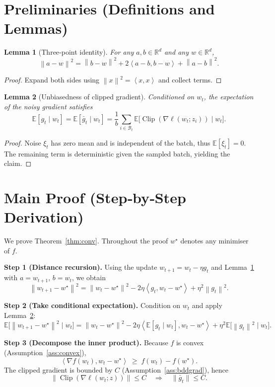 \documentclass{article}
\newtheorem{lemma}{Lemma}
\newcommand{\E}{\mathbb{E}}
\newcommand{\R}{\mathbb{R}}
\newcommand{\norm}[1]{\left\|#1\right\|}
\newcommand{\ip}[2]{\left\langle #1,#2\right\rangle}
\newcommand{\grad}{\nabla}
\newcommand{\clip}[1]{\operatorname{Clip}\!\left(#1\right)}
\begin{document}
\newpage
\section*{Preliminaries (Definitions and Lemmas)}
\begin{lemma}[Three‑point identity]\label{lem:three}
For any $a,b\in\R^{d}$ and any $w\in\R^{d}$,
\[
\norm{a-w}^{2}= \norm{b-w}^{2}+2\ip{a-b}{b-w}+\norm{a-b}^{2}.
\]
\end{lemma}
\begin{proof}
Expand both sides using $\norm{x}^{2}= \ip{x}{x}$ and collect terms. \qedhere
\end{proof}

\begin{lemma}[Unbiasedness of clipped gradient]\label{lem:unbiased}
Conditioned on $w_t$, the expectation of the noisy gradient satisfies
\[
\E[g_t\mid w_t]=\E[\bar g_t\mid w_t]=\frac{1}{b}\sum_{i\in\mathcal{B}_t}\E\bigl[\clip{\grad\ell(w_t;z_i)}\mid w_t\bigr].
\]
\end{lemma}
\begin{proof}
Noise $\xi_t$ has zero mean and is independent of the batch, thus $\E[\xi_t]=0$. The remaining term is deterministic given the sampled batch, yielding the claim. \qedhere
\end{proof}

\section*{Main Proof (Step‑by‑Step Derivation)}
We prove Theorem~\ref{thm:conv}. Throughout the proof $w^{\star}$ denotes any minimiser of $f$.

\noindent\textbf{Step 1 (Distance recursion).}  
Using the update $w_{t+1}=w_t-\eta g_t$ and Lemma~\ref{lem:three} with $a=w_{t+1}$, $b=w_t$, we obtain
\[
\norm{w_{t+1}-w^{\star}}^{2}
 = \norm{w_t-w^{\star}}^{2}
   -2\eta\ip{g_t}{w_t-w^{\star}}
   +\eta^{2}\norm{g_t}^{2}.
\tag{2}\label{eq:rec}
\]

\noindent\textbf{Step 2 (Take conditional expectation).}  
Condition on $w_t$ and apply Lemma~\ref{lem:unbiased}:
\[
\E\!\bigl[\norm{w_{t+1}-w^{\star}}^{2}\mid w_t\bigr]
 = \norm{w_t-w^{\star}}^{2}
   -2\eta\ip{\E[g_t\mid w_t]}{w_t-w^{\star}}
   +\eta^{2}\E\!\bigl[\norm{g_t}^{2}\mid w_t\bigr].
\tag{3}
\]

\noindent\textbf{Step 3 (Decompose the inner product).}  
Because $f$ is convex (Assumption~\ref{ass:convex}),
\[
\ip{\grad f(w_t)}{w_t-w^{\star}}\;\ge\; f(w_t)-f(w^{\star}).
\tag{4}
\]
The clipped gradient is bounded by $C$ (Assumption~\ref{ass:bddgrad}), hence
\[
\bigl\|\clip{\grad\ell(w_t;z)}\bigr\|\le C\quad\Longrightarrow\quad
\|\bar g_t\|\le C.
\tag{5}
\]
\end{document}
